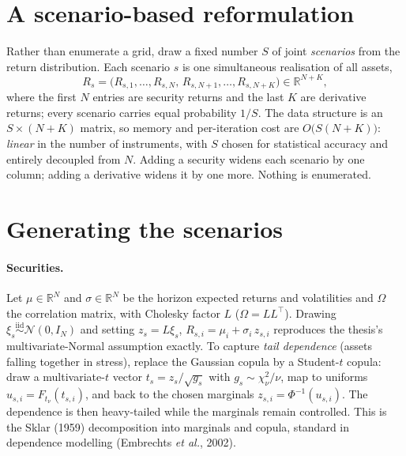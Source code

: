 \documentclass[11pt]{article}
\newcommand{\R}{\mathbb{R}}
\newcommand{\T}{^{\!\top}}
\begin{document}
\section{A scenario-based reformulation}
Rather than enumerate a grid, draw a fixed number $S$ of joint
\emph{scenarios} from the return distribution. Each scenario $s$ is one
simultaneous realisation of all assets,
\[
   R_s = \big(R_{s,1},\dots,R_{s,N},\,R_{s,N+1},\dots,R_{s,N+K}\big)\in\R^{N+K},
\]
where the first $N$ entries are security returns and the last $K$ are derivative
returns; every scenario carries equal probability $1/S$. The data structure is an
$S\times(N+K)$ matrix, so memory and per-iteration cost are $O\!\big(S(N+K)\big)$:
\emph{linear} in the number of instruments, with $S$ chosen for statistical
accuracy and entirely decoupled from $N$. Adding a security widens each scenario
by one column; adding a derivative widens it by one more. Nothing is enumerated.

\section{Generating the scenarios}
\paragraph{Securities.}
Let $\mu\in\R^{N}$ and $\sigma\in\R^{N}$ be the horizon expected returns and
volatilities and $\Omega$ the correlation matrix, with Cholesky factor
$L$ ($\Omega = LL\T$). Drawing $\xi_s\stackrel{\text{iid}}{\sim}\mathcal N(0,I_N)$
and setting $z_s = L\xi_s$, $R_{s,i} = \mu_i + \sigma_i\,z_{s,i}$ reproduces the
thesis's multivariate-Normal assumption exactly. To capture \emph{tail dependence}
(assets falling together in stress), replace the Gaussian copula by a Student-$t$
copula: draw a multivariate-$t$ vector $t_s = z_s/\sqrt{g_s}$ with
$g_s\sim\chi^2_{\nu}/\nu$, map to uniforms $u_{s,i}=F_{t_\nu}(t_{s,i})$, and back to
the chosen marginals $z_{s,i}=\Phi^{-1}(u_{s,i})$. The dependence is then heavy-tailed
while the marginals remain controlled. This is the Sklar (1959) decomposition into
marginals and copula, standard in dependence modelling (Embrechts \emph{et al.}, 2002).
\end{document}
